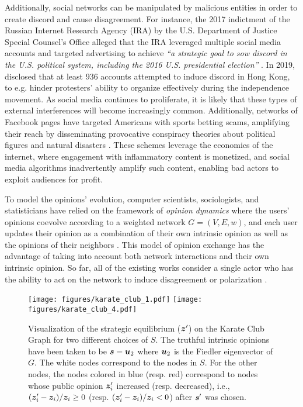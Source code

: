 Additionally, social networks can be manipulated by malicious entities in order to create discord and cause disagreement. For instance,  the 2017 indictment of the Russian Internet Research Agency (IRA) by the U.S. Department of Justice Special Counsel’s Office alleged that the IRA leveraged multiple social media accounts and targeted advertising to achieve \textit{``a strategic goal to sow discord in the U.S. political system, including the 2016 U.S. presidential election''} \citep{mueller2018united}. In 2019, \citet{twitter2019hongkong} disclosed that at least 936 accounts attempted to induce discord in Hong Kong, to e.g. hinder protesters’ ability to organize effectively during the independence movement. As social media continues to proliferate, it is likely that these types of external interferences will become increasingly common. Additionally, networks of Facebook pages have targeted Americans with sports betting scams, amplifying their reach by disseminating provocative conspiracy theories about political figures and natural disasters \citep{wired2024profiteers}. These schemes leverage the economics of the internet, where engagement with inflammatory content is monetized, and social media algorithms inadvertently amplify such content, enabling bad actors to exploit audiences for profit.

To model the opinions' evolution, computer scientists, sociologists, and statisticians have relied on the framework of \emph{opinion dynamics} where the users' opinions coevolve according to a weighted network $G = (V, E, w)$, and each user updates their opinion as a combination of their own intrinsic opinion as well as the opinions of their neighbors \citep{Friedkin1990}. This model of opinion exchange has the advantage of taking into account both network interactions and their own intrinsic opinion. So far, all of the existing works consider a single actor who has the ability to act on the network to induce disagreement or polarization \cite{musco2018minimizing,chen2021adversarial,wang2024relationship,tsourakakis-2024,gaitonde2020adversarial,racz2023towards,Chitra2020}.  

\begin{figure}
    \centering
    \texttt{[image: figures/karate\_club\_1.pdf]}
    \texttt{[image: figures/karate\_club\_4.pdf]}

    \caption{Visualization of the strategic equilibrium ($\bm{z}^\prime$) on the Karate Club Graph for two different choices of $S$. The truthful intrinsic opinions have been taken to be $\bm{s} = \bm{u}_2$ where $\bm{u}_2$ is the Fiedler eigenvector of $G$. The white nodes correspond to the nodes in $S$. For the other nodes, the nodes colored in blue (resp. red) correspond to nodes whose public opinion $\bm{z}^\prime_i$ increased (resp. decreased), i.e., $(\bm{z}^\prime_i - \bm{z}_i) / \bm{z}_i \ge 0$ (resp. $(\bm{z}^\prime_i - \bm{z}_i) / \bm{z}_i < 0$) after $\bm{s}'$ was chosen.}
    \label{fig:visualization}
\end{figure}

